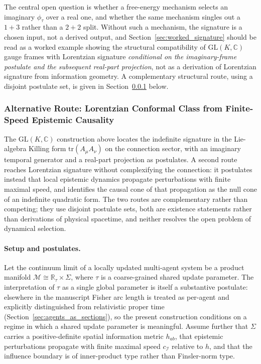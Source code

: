 \documentclass[11pt]{article}
\begin{document}
The central open question is whether a free-energy mechanism selects an imaginary $\phi_\tau$ over a real one, and whether the same mechanism singles out a $1{+}3$ rather than a $2{+}2$ split. Without such a mechanism, the signature is a chosen input, not a derived output, and Section~\ref{sec:worked_signature} should be read as a worked example showing the structural compatibility of $\mathrm{GL}(K,\mathbb{C})$ gauge frames with Lorentzian signature \emph{conditional on the imaginary-frame postulate and the subsequent real-part projection}, not as a derivation of Lorentzian signature from information geometry. A complementary structural route, using a disjoint postulate set, is given in Section~\ref{sec:causal_cone_route} below.

\subsubsection{Alternative Route: Lorentzian Conformal Class from Finite-Speed Epistemic Causality}
\label{sec:causal_cone_route}

The $\mathrm{GL}(K,\mathbb{C})$ construction above locates the indefinite signature in the Lie-algebra Killing form $\mathrm{tr}(A_\mu A_\nu)$ on the connection sector, with an imaginary temporal generator and a real-part projection as postulates. A second route reaches Lorentzian signature without complexifying the connection: it postulates instead that local epistemic dynamics propagate perturbations with finite maximal speed, and identifies the causal cone of that propagation as the null cone of an indefinite quadratic form. The two routes are complementary rather than competing; they use disjoint postulate sets, both are existence statements rather than derivations of physical spacetime, and neither resolves the open problem of dynamical selection.

\paragraph{Setup and postulates.}
Let the continuum limit of a locally updated multi-agent system be a product manifold $\mathcal{M} \cong \mathbb{R}_\tau \times \Sigma$, where $\tau$ is a coarse-grained shared update parameter. The interpretation of $\tau$ as a single global parameter is itself a substantive postulate: elsewhere in the manuscript Fisher arc length is treated as per-agent and explicitly distinguished from relativistic proper time (Section~\ref{sec:agents_as_sections}), so the present construction conditions on a regime in which a shared update parameter is meaningful. Assume further that $\Sigma$ carries a positive-definite spatial information metric $h_{ab}$, that epistemic perturbations propagate with finite maximal speed $c_\mathcal{I}$ relative to $h$, and that the influence boundary is of inner-product type rather than Finsler-norm type.
\end{document}

